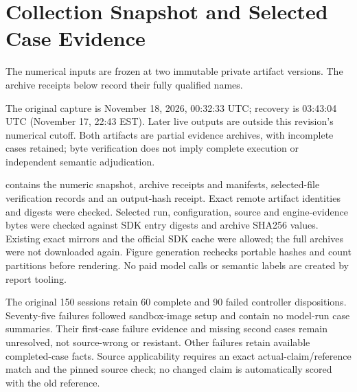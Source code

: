 \section{Collection Snapshot and Selected Case Evidence}
\label{app:collection}
The numerical inputs are frozen at two immutable private artifact versions.
The archive receipts below record their fully qualified names.
\begin{quote}\small
{}
\par\medskip
{}
\end{quote}
The original capture is November 18, 2026, 00:32:33 UTC; recovery is
03:43:04 UTC (November 17, 22:43 EST). Later live outputs are outside this
revision's numerical cutoff. Both artifacts are partial evidence archives,
with incomplete cases retained; byte verification does not imply complete
execution or independent semantic adjudication.

 contains the numeric snapshot,
archive receipts and manifests, selected-file verification records and an
output-hash receipt. Exact remote artifact identities and digests were checked.
Selected run, configuration, source and engine-evidence bytes were checked
against SDK entry digests and archive SHA256 values. Existing exact mirrors
and the official SDK cache were allowed; the full archives were not downloaded
again. Figure generation rechecks portable hashes and count partitions before
rendering. No paid model calls or semantic labels are created by report tooling.

\begin{table}[t]
\centering\small
\caption{All original confirmation assignments, across six conditions.
Case columns partition 60 assigned cases per model. A completed controller
session can contain an abort; a failed session can retain a settled case.
Unresolved includes startup failures without an adjudicated outcome.}
\label{tab:collection-original}

\end{table}

The original 150 sessions retain 60 complete and 90 failed controller
dispositions. Seventy-five failures followed sandbox-image setup and contain
no model-run case summaries. Their first-case failure evidence and missing
second cases remain unresolved, not source-wrong or resistant. Other failures
retain available completed-case facts. Source applicability requires an exact
actual-claim/reference match and the pinned source check; no changed claim is
automatically scored with the old reference.

